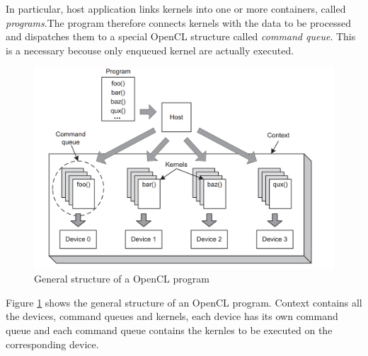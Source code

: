 In particular, host application links kernels into one or more
containers, called \emph{programs}.The program therefore connects
kernels with the data to be processed and dispatches them to a special
OpenCL structure called \emph{command queue}. This is a necessary
becouse only enqueued kernel are actually executed.


\begin{figure}[htp]
  \begin{center}
    \includegraphics[width=12cm]{./images/OpenCAL-CL/kernelDistribution}
    \caption{General structure of a OpenCL program}
    \label{fig:GeneralStructure}
  \end{center}
\end{figure}

Figure \ref{fig:GeneralStructure} shows the general structure of an
OpenCL program. Context contains all the devices, command queues
and kernels, each device has its own command queue and each
command queue contains the kernles to be executed on the corresponding
device.

